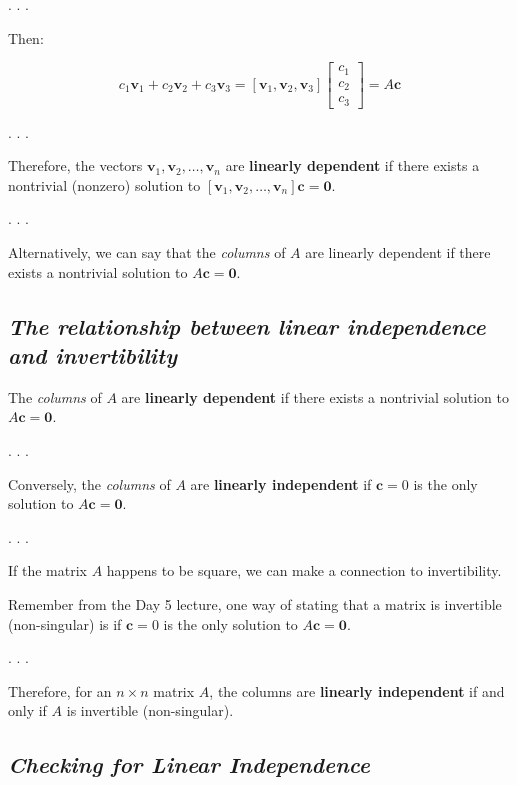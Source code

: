 \documentclass[
  letterpaper,
  DIV=11,
  numbers=noendperiod]{scrartcl}
\begin{document}
. . .

Then:

\[
c_{1} \mathbf{v}_{1}+c_{2} \mathbf{v}_{2}+c_{3} \mathbf{v}_{3}=\left[\mathbf{v}_{1}, \mathbf{v}_{2}, \mathbf{v}_{3}\right]\left[\begin{array}{l}
c_{1} \\
c_{2} \\
c_{3}
\end{array}\right]=A \mathbf{c}
\]

. . .

Therefore, the vectors
\(\mathbf{v}_1, \mathbf{v}_2, \ldots, \mathbf{v}_n\) are
\textbf{linearly dependent} if there exists a nontrivial (nonzero)
solution to
\([\mathbf{v}_1, \mathbf{v}_2, \ldots, \mathbf{v}_n] \mathbf{c}=\mathbf{0}\).

. . .

Alternatively, we can say that the \emph{columns} of \(A\) are linearly
dependent if there exists a nontrivial solution to
\(A \mathbf{c}=\mathbf{0}\).

\subsection{\texorpdfstring{\emph{The relationship between linear
independence and
invertibility}}{The relationship between linear independence and invertibility}}\label{the-relationship-between-linear-independence-and-invertibility}

The \emph{columns} of \(A\) are \textbf{linearly dependent} if there
exists a nontrivial solution to \(A \mathbf{c}=\mathbf{0}\).

. . .

Conversely, the \emph{columns} of \(A\) are \textbf{linearly
independent} if \(\mathbf{c}=0\) is the only solution to
\(A \mathbf{c}=\mathbf{0}\).

. . .

If the matrix \(A\) happens to be square, we can make a connection to
invertibility.

Remember from the Day 5 lecture, one way of stating that a matrix is
invertible (non-singular) is if \(\mathbf{c}=0\) is the only solution to
\(A \mathbf{c}=\mathbf{0}\).

. . .

Therefore, for an \(n \times n\) matrix \(A\), the columns are
\textbf{linearly independent} if and only if \(A\) is invertible
(non-singular).

\subsection{\texorpdfstring{\emph{Checking for Linear
Independence}}{Checking for Linear Independence}}\label{checking-for-linear-independence}
\end{document}
